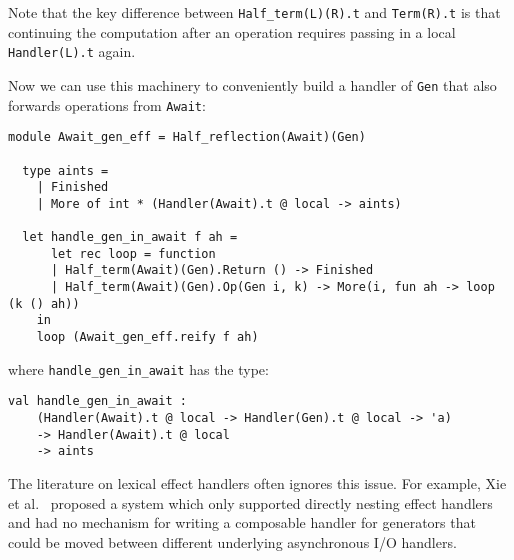 \documentclass[acmsmall, screen, review, anonymous]{acmart}
\theoremstyle{definition}
\begin{document}
Note that the key difference between
\lstinline[style=oxcaml]{Half_term(L)(R).t} and
\lstinline[style=oxcaml]{Term(R).t} is that continuing the computation
after an operation requires passing in a local
\lstinline[style=oxcaml]{Handler(L).t} again.

%
%

Now we can use this machinery to conveniently build a handler of
\lstinline[style=oxcaml]{Gen} that also forwards operations from
\lstinline[style=oxcaml]{Await}:
\begin{lstlisting}[style=oxcaml]
  module Await_gen_eff = Half_reflection(Await)(Gen)

  type aints =
    | Finished
    | More of int * (Handler(Await).t @ local -> aints)

  let handle_gen_in_await f ah =
      let rec loop = function
      | Half_term(Await)(Gen).Return () -> Finished
      | Half_term(Await)(Gen).Op(Gen i, k) -> More(i, fun ah -> loop (k () ah))
    in
    loop (Await_gen_eff.reify f ah)
\end{lstlisting}
where \lstinline[style=oxcaml]{handle_gen_in_await} has the type:
\begin{lstlisting}[style=oxcaml]
  val handle_gen_in_await :
    (Handler(Await).t @ local -> Handler(Gen).t @ local -> 'a)
    -> Handler(Await).t @ local
    -> aints
\end{lstlisting}

The literature on lexical effect handlers often ignores this issue. For
example, Xie et al.~\cite{xie2020effect} proposed a system which only
supported directly nesting effect handlers and had no mechanism for
writing a composable handler for generators that could be moved between
different underlying asynchronous I/O handlers.
\end{document}
